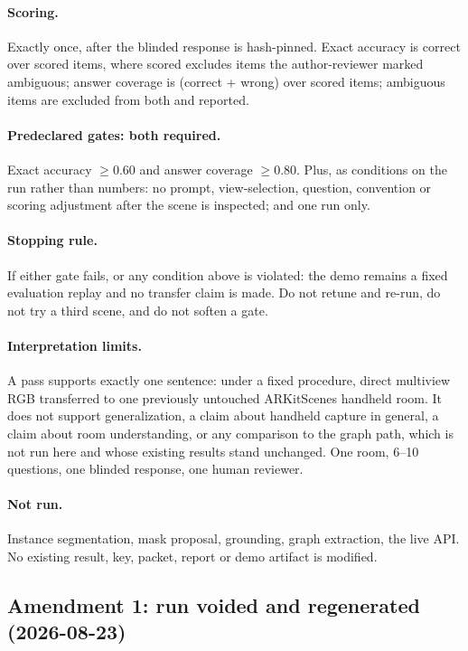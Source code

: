 \paragraph{Scoring.} Exactly once, after the blinded response is
hash-pinned. Exact accuracy is correct over scored items, where scored
excludes items the author-reviewer marked ambiguous; answer coverage is (correct +
wrong) over scored items; ambiguous items are excluded from both and
reported.

\paragraph{Predeclared gates: both required.} Exact accuracy $\ge 0.60$
and answer coverage $\ge 0.80$. Plus, as conditions on the run rather than
numbers: no prompt, view-selection, question, convention or scoring
adjustment after the scene is inspected; and one run only.

\paragraph{Stopping rule.} If either gate fails, or any condition above is
violated: the demo remains a fixed evaluation replay and no transfer claim
is made. Do not retune and re-run, do not try a third scene, and do not
soften a gate.

\paragraph{Interpretation limits.} A pass supports exactly one sentence:
under a fixed procedure, direct multiview RGB transferred to one previously
untouched ARKitScenes handheld room. It does not support generalization, a
claim about handheld capture in general, a claim about room understanding,
or any comparison to the graph path, which is not run here and whose
existing results stand unchanged. One room, 6--10 questions, one blinded
response, one human reviewer.

\paragraph{Not run.} Instance segmentation, mask proposal, grounding, graph
extraction, the live API. No existing result, key, packet, report or demo
artifact is modified.

\subsection{Amendment 1: run voided and regenerated (2026-08-23)}

